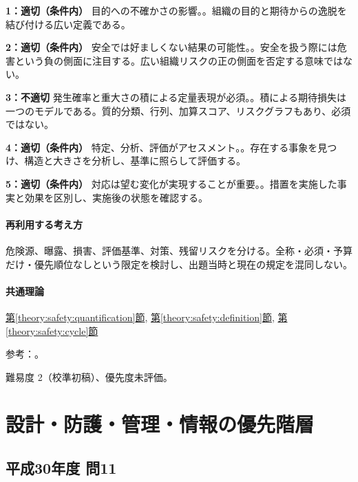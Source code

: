 \noindent\textbf{1：適切（条件内）} 目的への不確かさの影響。。組織の目的と期待からの逸脱を結び付ける広い定義である。\par

\noindent\textbf{2：適切（条件内）} 安全では好ましくない結果の可能性。。安全を扱う際には危害という負の側面に注目する。広い組織リスクの正の側面を否定する意味ではない。\par

\noindent\textbf{3：不適切} 発生確率と重大さの積による定量表現が必須。。積による期待損失は一つのモデルである。質的分類、行列、加算スコア、リスクグラフもあり、必須ではない。\par

\noindent\textbf{4：適切（条件内）} 特定、分析、評価がアセスメント。。存在する事象を見つけ、構造と大きさを分析し、基準に照らして評価する。\par

\noindent\textbf{5：適切（条件内）} 対応は望む変化が実現することが重要。。措置を実施した事実と効果を区別し、実施後の状態を確認する。\par

\paragraph{再利用する考え方} 危険源、曝露、損害、評価基準、対策、残留リスクを分ける。全称・必須・予算だけ・優先順位なしという限定を検討し、出題当時と現在の規定を混同しない。

\paragraph{共通理論} \hyperref[theory:safety:quantification]{第\ref*{theory:safety:quantification}節}, \hyperref[theory:safety:definition]{第\ref*{theory:safety:definition}節}, \hyperref[theory:safety:cycle]{第\ref*{theory:safety:cycle}節}

\par 参考：\cite{saf_ra2006,saf_iso31000}。

\par 難易度 2（校準初稿）、優先度未評価。

\section{設計・防護・管理・情報の優先階層}

\subsection{平成30年度 問11}
\label{q:h30-reg-apt-11}

